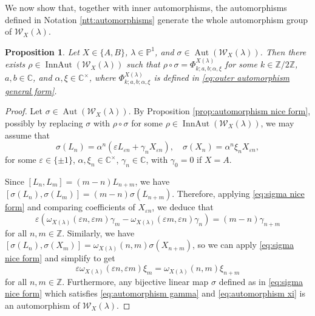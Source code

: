 \documentclass[11pt, svgnames]{amsart}
\newcommand{\ZZ}{\mathbb{Z}}
\newcommand{\CC}{\mathbb{C}}
\newcommand{\PP}{\mathbb{P}}
\newcommand{\W}{\mathcal{W}}
\DeclareMathOperator{\Aut}{Aut}
\DeclareMathOperator{\InnAut}{InnAut}
\newtheorem{proposition}{Proposition}[section]
\theoremstyle{definition}
\begin{document}
We now show that, together with inner automorphisms, the automorphisms defined in Notation \ref{ntt:automorphisms} generate the whole automorphism group of $\W_X(\lambda)$.

\begin{proposition}\label{prop:outer automorphisms}
    Let $X \in \{A,B\}$, $\lambda \in \PP^1$, and $\sigma \in \Aut(\W_X(\lambda))$. Then there exists $\rho \in \InnAut(\W_X(\lambda))$ such that $\rho \circ \sigma = \Phi_{k;a,b;\alpha,\xi}^{X(\lambda)}$ for some $k \in \ZZ/2\ZZ$, $a,b \in \CC$, and $\alpha, \xi \in \CC^\times$, where $\Phi_{k;a,b;\alpha,\xi}^{X(\lambda)}$ is defined in \eqref{eq:outer automorphism general form}.

\end{proposition}
\begin{proof}
    Let $\sigma \in \Aut(\W_X(\lambda))$. By Proposition \ref{prop:automorphism nice form}, possibly by replacing $\sigma$ with $\rho \circ \sigma$ for some $\rho \in \InnAut(\W_X(\lambda))$, we may assume that
    \begin{equation}\label{eq:sigma nice form}
        \sigma(L_n) = \alpha^n (\varepsilon L_{\varepsilon n} + \gamma_n X_{\varepsilon n}), \quad \sigma(X_n) = \alpha^n \xi_n X_{\varepsilon n},
    \end{equation}
    for some $\varepsilon \in \{\pm 1\}$, $\alpha, \xi_n \in \CC^\times$, $\gamma_n \in \CC$, with $\gamma_0 = 0$ if $X = A$.

    Since $[L_n,L_m] = (m - n)L_{n+m}$, we have $[\sigma(L_n),\sigma(L_m)] = (m - n)\sigma(L_{n+m})$. Therefore, applying \eqref{eq:sigma nice form} and comparing coefficients of $X_{\varepsilon n}$, we deduce that
    \begin{equation}\label{eq:automorphism gamma}
        \varepsilon(\omega_{X(\lambda)}(\varepsilon n, \varepsilon m)\gamma_m - \omega_{X(\lambda)}(\varepsilon m, \varepsilon n)\gamma_n) = (m - n)\gamma_{n+m}
    \end{equation}
    for all $n,m \in \ZZ$. Similarly, we have $[\sigma(L_n),\sigma(X_m)] = \omega_{X(\lambda)}(n,m)\sigma(X_{n+m})$, so we can apply \eqref{eq:sigma nice form} and simplify to get
    \begin{equation}\label{eq:automorphism xi}
        \varepsilon \omega_{X(\lambda)}(\varepsilon n, \varepsilon m)\xi_m = \omega_{X(\lambda)}(n,m)\xi_{n+m}
    \end{equation}
    for all $n,m \in \ZZ$. Furthermore, any bijective linear map $\sigma$ defined as in \eqref{eq:sigma nice form} which satisfies \eqref{eq:automorphism gamma} and \eqref{eq:automorphism xi} is an automorphism of $\W_X(\lambda)$.
    

\end{proof}
\end{document}
